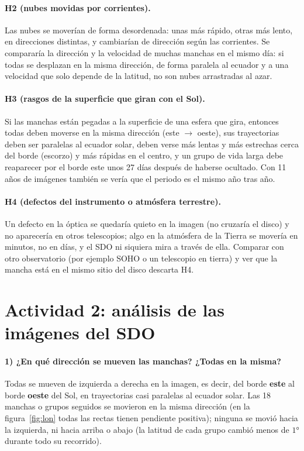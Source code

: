 \documentclass[11pt,a4paper]{article}
\begin{document}
\paragraph{H2 (nubes movidas por corrientes).}
Las nubes se moverían de forma desordenada: unas más rápido, otras más lento, en direcciones distintas, y cambiarían de dirección
según las corrientes. Se compararía la dirección y la velocidad de muchas manchas en el mismo día: si todas se desplazan
en la misma dirección, de forma paralela al ecuador y a una velocidad que solo depende de la latitud, no son nubes arrastradas al azar.

\paragraph{H3 (rasgos de la superficie que giran con el Sol).}
Si las manchas están pegadas a la superficie de una esfera que gira, entonces todas deben moverse en la misma dirección
(este $\to$ oeste), sus trayectorias deben ser paralelas al ecuador solar, deben verse más lentas y más estrechas cerca del borde
(escorzo) y más rápidas en el centro, y un grupo de vida larga debe reaparecer por el borde este unos 27 días después de
haberse ocultado. Con 11 años de imágenes también se vería que el periodo es el mismo año tras año.

\paragraph{H4 (defectos del instrumento o atmósfera terrestre).}
Un defecto en la óptica se quedaría quieto en la imagen (no cruzaría el disco) y no aparecería en otros telescopios;
algo en la atmósfera de la Tierra se movería en minutos, no en días, y el SDO ni siquiera mira a través de ella. Comparar con otro observatorio
(por ejemplo SOHO o un telescopio en tierra) y ver que la mancha está en el mismo sitio del disco descarta H4.

\section{Actividad 2: análisis de las imágenes del SDO}

\paragraph{1) ¿En qué dirección se mueven las manchas? ¿Todas en la misma?}
Todas se mueven de izquierda a derecha en la imagen, es decir, del borde \textbf{este} al borde \textbf{oeste} del Sol,
en trayectorias casi paralelas al ecuador solar. Las 18 manchas o grupos seguidos se movieron en la misma dirección
(en la figura~\ref{fig:lon} todas las rectas tienen pendiente positiva); ninguna se movió hacia la izquierda, ni hacia arriba o abajo
(la latitud de cada grupo cambió menos de $\ang{1}$ durante todo su recorrido).
\end{document}
